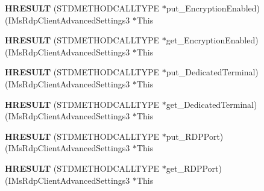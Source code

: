 \begin{DoxyCompactItemize}
\mbox{\label{struct_i_ms_rdp_client_advanced_settings3_vtbl_abfd8ef272f58d65f782efec417bbb51b}} 
{\bfseries H\+R\+E\+S\+U\+LT} (S\+T\+D\+M\+E\+T\+H\+O\+D\+C\+A\+L\+L\+T\+Y\+PE $\ast$put\+\_\+\+Encryption\+Enabled)(I\+Ms\+Rdp\+Client\+Advanced\+Settings3 $\ast$This
\item 
\mbox{\label{struct_i_ms_rdp_client_advanced_settings3_vtbl_aeb2047b38db7ade4e738b94bdd650b86}} 
{\bfseries H\+R\+E\+S\+U\+LT} (S\+T\+D\+M\+E\+T\+H\+O\+D\+C\+A\+L\+L\+T\+Y\+PE $\ast$get\+\_\+\+Encryption\+Enabled)(I\+Ms\+Rdp\+Client\+Advanced\+Settings3 $\ast$This
\item 
\mbox{\label{struct_i_ms_rdp_client_advanced_settings3_vtbl_afb4e08dbf5d796c42cd6a1830b7ffe7b}} 
{\bfseries H\+R\+E\+S\+U\+LT} (S\+T\+D\+M\+E\+T\+H\+O\+D\+C\+A\+L\+L\+T\+Y\+PE $\ast$put\+\_\+\+Dedicated\+Terminal)(I\+Ms\+Rdp\+Client\+Advanced\+Settings3 $\ast$This
\item 
\mbox{\label{struct_i_ms_rdp_client_advanced_settings3_vtbl_a5ea44e8e6ebad06757ed384928975116}} 
{\bfseries H\+R\+E\+S\+U\+LT} (S\+T\+D\+M\+E\+T\+H\+O\+D\+C\+A\+L\+L\+T\+Y\+PE $\ast$get\+\_\+\+Dedicated\+Terminal)(I\+Ms\+Rdp\+Client\+Advanced\+Settings3 $\ast$This
\item 
\mbox{\label{struct_i_ms_rdp_client_advanced_settings3_vtbl_ab1a172377b0c5ec4c281a64af648d1d4}} 
{\bfseries H\+R\+E\+S\+U\+LT} (S\+T\+D\+M\+E\+T\+H\+O\+D\+C\+A\+L\+L\+T\+Y\+PE $\ast$put\+\_\+\+R\+D\+P\+Port)(I\+Ms\+Rdp\+Client\+Advanced\+Settings3 $\ast$This
\item 
\mbox{\label{struct_i_ms_rdp_client_advanced_settings3_vtbl_a48acd1d762df5e480533a343f26c7cfc}} 
{\bfseries H\+R\+E\+S\+U\+LT} (S\+T\+D\+M\+E\+T\+H\+O\+D\+C\+A\+L\+L\+T\+Y\+PE $\ast$get\+\_\+\+R\+D\+P\+Port)(I\+Ms\+Rdp\+Client\+Advanced\+Settings3 $\ast$This
\item 
\mbox{\label{struct_i_ms_rdp_client_advanced_settings3_vtbl_a06a9c6b74b1d1fa429956ccb4242fb3f}} 

\end{DoxyCompactItemize}
